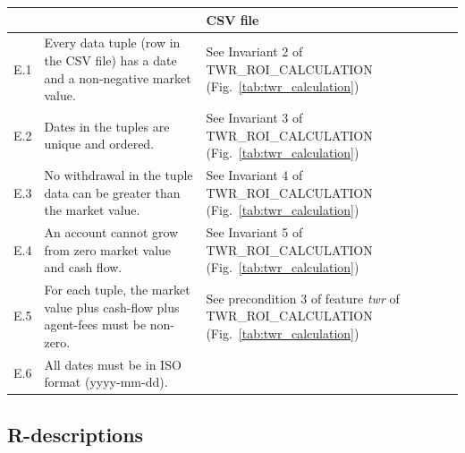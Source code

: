 \documentclass[runningheads,12pt]{article}
\begin{document}
\centering
\begin{longtable}{|l|p{9cm}|p{5cm}|}

\hline
\multicolumn{3}{|c|}{\textbf{CSV file}} \\

\hline
E.1 & Every data tuple (row in the CSV file) has a date and a non-negative market value. & See Invariant 2 of TWR\_ROI\_CALCULATION (Fig.~\ref{tab:twr_calculation})\\

\hline
E.2 &  Dates in the tuples are unique and ordered. & See Invariant 3 of TWR\_ROI\_CALCULATION (Fig.~\ref{tab:twr_calculation})\\

\hline
E.3 & No withdrawal in the tuple data can be greater than the market value. & See Invariant 4 of TWR\_ROI\_CALCULATION (Fig.~\ref{tab:twr_calculation})\\

\hline
E.4 & An account cannot grow from zero market value and cash flow. & See Invariant 5 of TWR\_ROI\_CALCULATION (Fig.~\ref{tab:twr_calculation})\\

\hline
E.5 &  For each tuple, the market value plus cash-flow plus agent-fees must be non-zero. & See precondition 3 of feature \textit{twr} of TWR\_ROI\_CALCULATION (Fig.~\ref{tab:twr_calculation})\\

\hline
E.6 &  All dates must be in ISO format (yyyy-mm-dd). & \\

\hline
\end{longtable}

\newpage
\subsection{R-descriptions}
\end{document}
